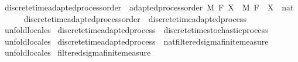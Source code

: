 \begin{isabellebody}
\isamarkupfalse%
\ discrete{\isacharunderscore}{\kern0pt}time{\isacharunderscore}{\kern0pt}adapted{\isacharunderscore}{\kern0pt}process{\isacharunderscore}{\kern0pt}order\ {\isacharequal}{\kern0pt}\ adapted{\isacharunderscore}{\kern0pt}process{\isacharunderscore}{\kern0pt}order\ M\ F\ X\ \ M\ F\ \ X\ {\isacharcolon}{\kern0pt}{\isacharcolon}{\kern0pt}\ {\isachardoublequoteopen}nat\ {\isasymRightarrow}\ {\isacharunderscore}{\kern0pt}\ {\isasymRightarrow}\ {\isacharunderscore}{\kern0pt}{\isachardoublequoteclose}\isanewline
\isanewline
{}\isamarkupfalse%
\ discrete{\isacharunderscore}{\kern0pt}time{\isacharunderscore}{\kern0pt}adapted{\isacharunderscore}{\kern0pt}process{\isacharunderscore}{\kern0pt}order\ {\isasymsubseteq}\ discrete{\isacharunderscore}{\kern0pt}time{\isacharunderscore}{\kern0pt}adapted{\isacharunderscore}{\kern0pt}process%
\isadelimproof
\ %
\endisadelimproof
%
\isatagproof
{}\isamarkupfalse%
\ {\isacharparenleft}{\kern0pt}unfold{\isacharunderscore}{\kern0pt}locales{\isacharparenright}{\kern0pt}%
\endisatagproof
{\isafoldproof}%
%
\isadelimproof
%
\endisadelimproof
\isanewline
{}\isamarkupfalse%
\ discrete{\isacharunderscore}{\kern0pt}time{\isacharunderscore}{\kern0pt}adapted{\isacharunderscore}{\kern0pt}process\ {\isasymsubseteq}\ discrete{\isacharunderscore}{\kern0pt}time{\isacharunderscore}{\kern0pt}stochastic{\isacharunderscore}{\kern0pt}process%
\isadelimproof
\ %
\endisadelimproof
%
\isatagproof
{}\isamarkupfalse%
\ {\isacharparenleft}{\kern0pt}unfold{\isacharunderscore}{\kern0pt}locales{\isacharparenright}{\kern0pt}%
\endisatagproof
{\isafoldproof}%
%
\isadelimproof
%
\endisadelimproof
\isanewline
{}\isamarkupfalse%
\ discrete{\isacharunderscore}{\kern0pt}time{\isacharunderscore}{\kern0pt}adapted{\isacharunderscore}{\kern0pt}process\ {\isasymsubseteq}\ nat{\isacharunderscore}{\kern0pt}filtered{\isacharunderscore}{\kern0pt}sigma{\isacharunderscore}{\kern0pt}finite{\isacharunderscore}{\kern0pt}measure%
\isadelimproof
\ %
\endisadelimproof
%
\isatagproof
{}\isamarkupfalse%
\ {\isacharparenleft}{\kern0pt}unfold{\isacharunderscore}{\kern0pt}locales{\isacharparenright}{\kern0pt}%
\endisatagproof
{\isafoldproof}%
%
\isadelimproof
%
\endisadelimproof
%
\isadelimdocument
%
\endisadelimdocument
%
\isatagdocument
%
\isamarkuptrue%
%
\endisatagdocument
{\isafolddocument}%
%
\isadelimdocument
%
\endisadelimdocument
{}\isamarkupfalse%
\ filtered{\isacharunderscore}{\kern0pt}sigma{\isacharunderscore}{\kern0pt}finite{\isacharunderscore}{\kern0pt}measure\isanewline

\end{isabellebody}
